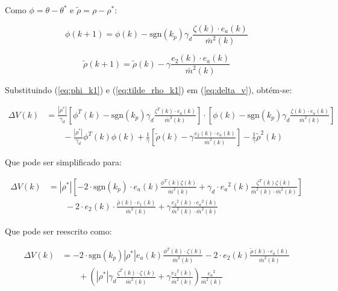     Como $\phi = \theta - \theta^*$ e $\tilde{\rho} = \rho - \rho^*$:

    \begin{equation}
        \phi(k+1) = \phi(k) - \mathrm{sgn}(k_p) \gamma_d \frac{\zeta(k) \cdot e_a(k)}{{\bar{m}}^2(k)}
        \label{eq:phi_k1}
    \end{equation}

    \begin{equation}
        \tilde{\rho}(k+1) = \tilde{\rho}(k) - \gamma \frac{e_2(k) \cdot e_a(k)}{{\bar{m}}^2(k)}
        \label{eq:tilde_rho_k1}
    \end{equation}

    Substituindo (\ref{eq:phi_k1}) e (\ref{eq:tilde_rho_k1}) em (\ref{eq:delta_v}), obtém-se:

    \begin{equation}
        \begin{split}
            \Delta V(k) &= \frac{|\rho^*|}{\gamma_d} \left[ \phi^T(k) - \mathrm{sgn}(k_p) \gamma_d
                \frac{\zeta^T(k) \cdot e_a(k)}{{\bar{m}}^2(k)} \right] \cdot
                \left[ \phi(k) - \mathrm{sgn}(k_p) \gamma_d \frac{\zeta(k) \cdot e_a(k)}{{\bar{m}}^2(k)} \right] \\
                &\qquad {}- \frac{|\rho^*|}{\gamma_d} \phi^T(k) \phi(k) + \frac{1}{\gamma} \left[ \tilde{\rho}(k)
                - \gamma \frac{e_2(k) \cdot e_a(k)}{{\bar{m}}^2(k)} \right]
                - \frac{1}{\gamma} {\tilde{\rho}}^2(k)
        \end{split}
    \end{equation}

    Que pode ser simplificado para:

    \begin{equation*}
        \begin{split}
            \Delta V(k) &= |\rho^*| \left[ - 2 \cdot \mathrm{sgn}(k_p) \cdot e_a(k) \frac{\phi^T(k) \zeta(k)}{{\bar{m}}^2(k)}
            + \gamma_d \cdot {e_a}^2(k) \frac{\zeta^T(k) \zeta(k)}{{\bar{m}}^2(k) \cdot {\bar{m}}^2(k)} \right] \\
            &\qquad {}- 2 \cdot e_2(k) \cdot \frac{\bar{\rho}(k) \cdot e_1(k)}{{\bar{m}}^2(k)}
            + \gamma \frac{{e_2}^2(k) \cdot {e_a}^2(k)}{{\bar{m}}^2(k) \cdot {\bar{m}}^2(k)}
        \end{split}
    \end{equation*}

    Que pode ser reescrito como:

    \begin{equation*}
        \begin{split}
            \Delta V(k) &= -2 \cdot \mathrm{sgn}(k_p) |\rho^*| e_a(k) \frac{\phi^T(k) \cdot \zeta(k)}{{\bar{m}}^2(k)}
                -2 \cdot e_2(k) \frac{\tilde{\rho}(k) \cdot e_a(k)}{{\bar{m}}^2(k)} \\
                &\qquad {}+ \left( |\rho^*| \gamma_d \frac{\zeta^T(k) \cdot \zeta(k)}{{\bar{m}}^2(k)}
                + \gamma \frac{{e_2}^2(k)}{{\bar{m}}^2(k)} \right) \frac{{e_a}^2}{{\bar{m}}^2(k)}
            \end{split}
    \end{equation*}

